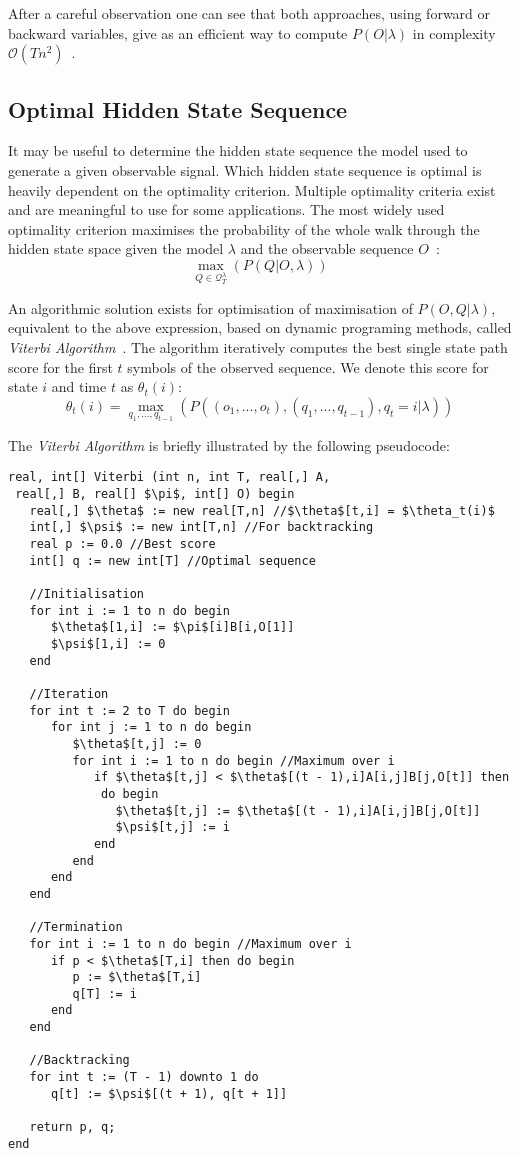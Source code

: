\documentclass[a4paper,12pt]{article}
\begin{document}
After a careful observation one can see that both approaches, using forward or backward variables, give as an efficient way to compute $P(O|\lambda)$ in complexity $\mathcal{O}(Tn^2)$~\cite{Rabiner89hmm}.

\subsection{Optimal Hidden State Sequence}

It may be useful to determine the hidden state sequence the model used to generate a given observable signal. Which hidden state sequence is optimal is heavily dependent on the optimality criterion. Multiple optimality criteria exist and are meaningful to use for some applications. The most widely used optimality criterion maximises the probability of the whole walk through the hidden state space given the model $\lambda$ and the observable sequence $O$~\cite{Rabiner89hmm}:
$$\max_{Q\in\mathcal{Q}_T^\lambda}(P(Q|O, \lambda))$$

An algorithmic solution exists for optimisation of maximisation of $P(O, Q|\lambda)$, equivalent to the above expression, based on dynamic programing methods, called \emph{Viterbi Algorithm}~\cite{Viterbi1967, Forney1973}. The algorithm iteratively computes the best single state path score for the first $t$ symbols of the observed sequence. We denote this score for state $i$ and time $t$ as $\theta_t(i)$:
$$\theta_t(i) = \max_{q_1, ..., q_{t-1}}(P((o_1, ..., o_t), (q_1, ..., q_{t-1}), q_t=i|\lambda))$$

The \emph{Viterbi Algorithm} is briefly illustrated by the following pseudocode:
\begin{lstlisting}[mathescape=true]
real, int[] Viterbi (int n, int T, real[,] A,
 real[,] B, real[] $\pi$, int[] O) begin
   real[,] $\theta$ := new real[T,n] //$\theta$[t,i] = $\theta_t(i)$
   int[,] $\psi$ := new int[T,n] //For backtracking
   real p := 0.0 //Best score
   int[] q := new int[T] //Optimal sequence
   
   //Initialisation
   for int i := 1 to n do begin
      $\theta$[1,i] := $\pi$[i]B[i,O[1]]
      $\psi$[1,i] := 0
   end
   
   //Iteration
   for int t := 2 to T do begin
      for int j := 1 to n do begin
         $\theta$[t,j] := 0
         for int i := 1 to n do begin //Maximum over i
            if $\theta$[t,j] < $\theta$[(t - 1),i]A[i,j]B[j,O[t]] then
             do begin
               $\theta$[t,j] := $\theta$[(t - 1),i]A[i,j]B[j,O[t]]
               $\psi$[t,j] := i
            end
         end
      end
   end
   
   //Termination
   for int i := 1 to n do begin //Maximum over i
      if p < $\theta$[T,i] then do begin
         p := $\theta$[T,i]
         q[T] := i
      end
   end
   
   //Backtracking
   for int t := (T - 1) downto 1 do
      q[t] := $\psi$[(t + 1), q[t + 1]]

   return p, q;
end
\end{lstlisting}
\end{document}
